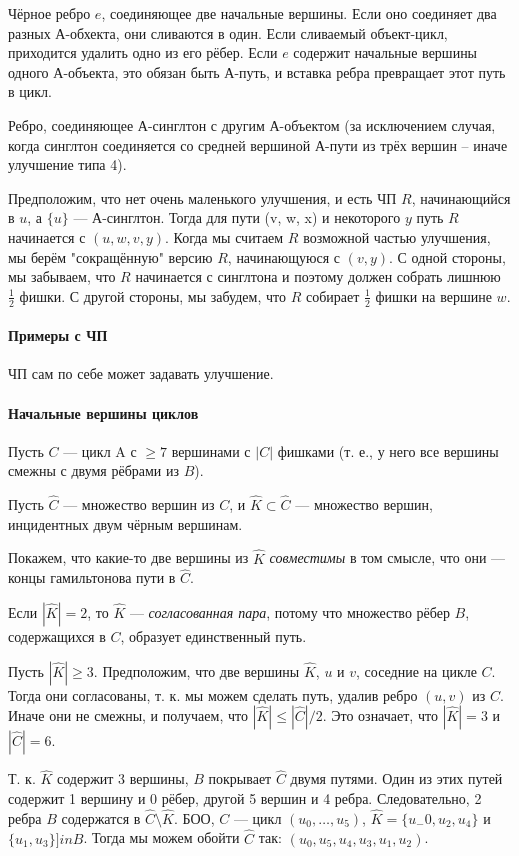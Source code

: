 Чёрное ребро $e$, соединяющее две начальные вершины. Если оно соединяет два разных А-обхекта, они сливаются в один. Если сливаемый объект-цикл, приходится удалить одно из его рёбер. Если $e$ содержит начальные вершины одного А-объекта, это обязан быть А-путь, и вставка ребра превращает этот путь в цикл.

Ребро, соединяющее А-синглтон с другим А-объектом (за исключением случая, когда синглтон соединяется со средней вершиной А-пути из трёх вершин -- иначе улучшение типа 4).

Предположим, что нет очень маленького улучшения, и есть ЧП $R$, начинающийся в $u$, а $\{u\}$ --- А-синглтон. Тогда для пути (v, w, x) и некоторого $y$ путь $R$ начинается с $(u, w, v, y)$. Когда мы считаем $R$ возможной частью улучшения, мы берём "сокращённую" версию $R$, начинающуюся с $(v, y)$. С одной стороны, мы забываем, что $R$ начинается с синглтона и поэтому должен собрать лишнюю $\frac{1}{2}$ фишки. С другой стороны, мы забудем, что $R$ собирает $\frac{1}{2}$ фишки на вершине $w$.

\paragraph{Примеры с ЧП}
ЧП сам по себе может задавать улучшение. 

\paragraph{Начальные вершины циклов}
Пусть $C$ --- цикл A с $\ge 7$ вершинами с $|C|$ фишками (т. е., у него все вершины смежны с двумя рёбрами из $B$).

Пусть $\hat{C}$ --- множество вершин из $C$, и $\hat{K} \subset \hat{C}$ --- множество вершин, инцидентных двум чёрным вершинам. 

Покажем, что какие-то две вершины из $\hat{K}$ \textit{совместимы} в том смысле, что они --- концы гамильтонова пути в $\hat{C}$.

Если $|\hat{K}| = 2$, то $\hat{K}$ --- \textit{согласованная пара}, потому что множество рёбер $B$, содержащихся в $C$, образует единственный путь.

Пусть $|\hat{K}| \ge 3$. 
Предположим, что две вершины $\hat{K}$, $u$ и $v$, соседние на цикле $C$. Тогда они согласованы, т. к. мы можем сделать путь, удалив ребро $(u, v)$ из $C$.
Иначе они не смежны, и получаем, что $|\hat{K}| \le |\hat{C}|/2$. Это означает, что $|\hat{K}| = 3$ и $|\hat{C}| = 6$.

Т. к. $\hat{K}$ содержит 3 вершины, $B$ покрывает $\hat{C}$ двумя путями. Один из этих путей содержит 1 вершину и 0 рёбер, другой 5 вершин и 4 ребра. Следовательно, 2 ребра $B$ содержатся в $\hat{C} \setminus \hat{K}$. БОО, $C$ --- цикл $(u_0, \dots, u_5)$, $\hat{K} = \{u_-0, u_2, u_4\}$ и $\{u_1, u_3\} ]in B$. Тогда мы можем обойти $\hat{C}$ так: $(u_0, u_5, u_4, u_3, u_1, u_2)$.

